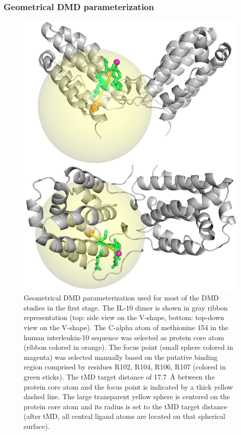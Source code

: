 \subsubsection{Geometrical DMD parameterization}
\label{dmdil10:method_geom_setup}

\begin{figure}
\centering
\includegraphics[width=1.0\textwidth]{gfx/dmdil10/round1_il10_ligandcenter_proteincore_sphere_top_and_side_001.jpg}
\caption[]{Geometrical DMD parameterization used for most of the DMD studies
in the first stage. The IL-10 dimer is shown in gray ribbon representation (top:
side view on the V-shape, bottom: top-down view on the V-shape). The C-alpha
atom of methionine 154 in the human interleukin-10 sequence was selected as
protein core atom (ribbon colored in orange). The focus point (small sphere
colored in magenta) was selected manually based on the putative binding region
comprised by residues R102, R104, R106, R107 (colored in green sticks). The tMD
target distance of \SI{17.7}{\angstrom} between the protein core atom and the
focus point is indicated by a thick yellow dashed line. The large transparent
yellow sphere is centered on the protein core atom and its radius is set to the
tMD target distance (after tMD, all central ligand atoms are located on that
spherical surface).}
\label{fig:dmdil10:dmd_geometry_round1}
\end{figure}

